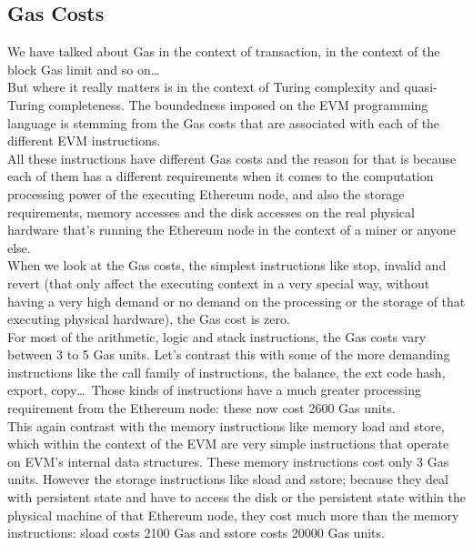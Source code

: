 \subsection*{Gas Costs}
We have talked about Gas in the context of transaction, in the context of the block Gas limit and so on\dots\\
But where it really matters is in the context of Turing complexity and quasi-Turing completeness.
The boundedness imposed on the EVM programming language is stemming from the Gas costs that are associated with each of the different EVM instructions.\\

All these instructions have different Gas costs and the reason for that is because each of them has a different requirements when it comes to the computation processing power of the executing Ethereum node, and also the storage requirements, memory accesses and the disk accesses on the real physical hardware that's running the Ethereum node in the context of a miner or anyone else.\\

When we look at the Gas costs, the simplest instructions like stop, invalid and revert (that only affect the executing context in a very special way, without having a very high demand or no demand on the processing or the storage of that executing physical hardware), the Gas cost is zero.\\

For most of the arithmetic, logic and stack instructions, the Gas costs vary between 3 to 5 Gas units.
Let's contrast this with some of the more demanding instructions like the call family of instructions, the balance, the ext code hash, export, copy\dots\,
Those kinds of instructions have a much greater processing requirement from the Ethereum node: these now cost 2600 Gas units.\\

This again contrast with the memory instructions like memory load and store, which within the context of the EVM are very simple instructions that operate on EVM's internal data structures.
These memory instructions cost only 3 Gas units.
However the storage instructions like sload and sstore; because they deal with persistent state and have to access the disk or the persistent state within the physical machine of that Ethereum node, they cost much more than the memory instructions: sload costs 2100 Gas and sstore costs 20000 Gas units.\\

